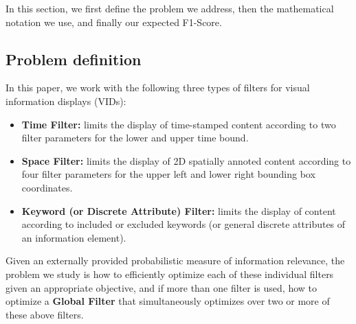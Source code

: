 In this section, we first define the problem we address, then the mathematical notation we use, and finally our  expected F1-Score.



\subsection{Problem definition}

In this paper, we work with the following three types of filters for visual information displays (VIDs):
\begin{itemize}
\item {\bf Time Filter:} limits the display of time-stamped content according to two filter parameters for the lower and upper time bound. 
\item {\bf Space Filter:} limits the display of 2D spatially annoted content according to four filter parameters for the upper left and lower right bounding box coordinates.
\item {\bf Keyword (or Discrete Attribute) Filter:} limits the display of content according to included or excluded keywords (or general discrete attributes of an information element).
\end{itemize}
Given an externally provided probabilistic measure of information relevance, 
the problem we study is how to efficiently optimize each of these individual filters given an appropriate objective, and if more than one filter is used, how to optimize a {\bf Global Filter} that simultaneously optimizes over two or more of these above filters.  

